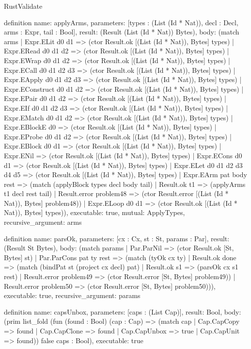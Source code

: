 \begin{lexlean}{RustValidate}
\begin{semanticmodule}
definition{
  name: applyArms,
  parameters: [types : (List (Id * Nat)), decl : Decl, arms : Expr, tail : Bool],
  result: (Result (List (Id * Nat)) Bytes),
  body: (match arms
    | Expr.ELit d0 d1 => (ctor Result.ok [(List (Id * Nat)), Bytes] types)
    | Expr.ERead d0 d1 d2 => (ctor Result.ok [(List (Id * Nat)), Bytes] types)
    | Expr.EWrap d0 d1 d2 => (ctor Result.ok [(List (Id * Nat)), Bytes] types)
    | Expr.ECall d0 d1 d2 d3 => (ctor Result.ok [(List (Id * Nat)), Bytes] types)
    | Expr.EApply d0 d1 d2 d3 => (ctor Result.ok [(List (Id * Nat)), Bytes] types)
    | Expr.EConstruct d0 d1 d2 => (ctor Result.ok [(List (Id * Nat)), Bytes] types)
    | Expr.EPair d0 d1 d2 => (ctor Result.ok [(List (Id * Nat)), Bytes] types)
    | Expr.EIf d0 d1 d2 d3 => (ctor Result.ok [(List (Id * Nat)), Bytes] types)
    | Expr.EMatch d0 d1 d2 => (ctor Result.ok [(List (Id * Nat)), Bytes] types)
    | Expr.EBlockE d0 => (ctor Result.ok [(List (Id * Nat)), Bytes] types)
    | Expr.EProbe d0 d1 d2 => (ctor Result.ok [(List (Id * Nat)), Bytes] types)
    | Expr.EBlock d0 d1 => (ctor Result.ok [(List (Id * Nat)), Bytes] types)
    | Expr.ENil => (ctor Result.ok [(List (Id * Nat)), Bytes] types)
    | Expr.ECons d0 d1 => (ctor Result.ok [(List (Id * Nat)), Bytes] types)
    | Expr.ELet d0 d1 d2 d3 d4 d5 => (ctor Result.ok [(List (Id * Nat)), Bytes] types)
    | Expr.EArm pat body rest => (match (applyBlock types decl body tail)
      | Result.ok t1 => (applyArms t1 decl rest tail)
      | Result.error problem48 => (ctor Result.error [(List (Id * Nat)), Bytes] problem48))
    | Expr.ELoop d0 d1 => (ctor Result.ok [(List (Id * Nat)), Bytes] types)),
  executable: true,
  mutual: ApplyTypes,
  recursive_argument: arms
}

definition{
  name: parsOk,
  parameters: [cx : Cx, st : St, params : Par],
  result: (Result St Bytes),
  body: (match params
    | Par.ParNil => (ctor Result.ok [St, Bytes] st)
    | Par.ParCons pat ty rest => (match (tyOk cx ty)
      | Result.ok done => (match (bindPat st (project cx decl) pat)
        | Result.ok s1 => (parsOk cx s1 rest)
        | Result.error problem49 => (ctor Result.error [St, Bytes] problem49))
      | Result.error problem50 => (ctor Result.error [St, Bytes] problem50))),
  executable: true,
  recursive_argument: params
}

definition{
  name: capsUnbox,
  parameters: [caps : (List Cap)],
  result: Bool,
  body: (prim list_fold (fun (found : Bool) (cap : Cap) => (match cap
    | Cap.CapCopy => found
    | Cap.CapClone => found
    | Cap.CapUnbox => true
    | Cap.CapUnit => found)) false caps : Bool),
  executable: true
}


\end{semanticmodule}
\end{lexlean}
